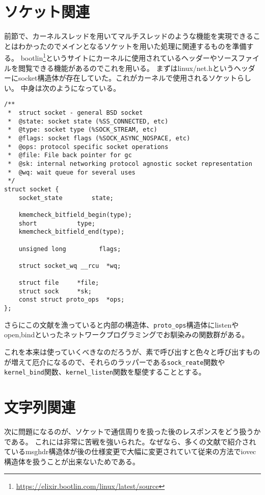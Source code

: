 \section{ソケット関連}

前節で、カーネルスレッドを用いてマルチスレッドのような機能を実現できることはわかったのでメインとなるソケットを用いた処理に関連するものを準備する。
bootlin\footnote{\url{https://elixir.bootlin.com/linux/latest/source}}というサイトにカーネルに使用されているヘッダーやソースファイルを閲覧できる機能があるのでこれを用いる。
まずはlinux/net.hというヘッダーにsocket構造体が存在していた。これがカーネルで使用されるソケットらしい。
中身は次のようになっている。
\begin{verbatim}
/**
 *  struct socket - general BSD socket
 *  @state: socket state (%SS_CONNECTED, etc)
 *  @type: socket type (%SOCK_STREAM, etc)
 *  @flags: socket flags (%SOCK_ASYNC_NOSPACE, etc)
 *  @ops: protocol specific socket operations
 *  @file: File back pointer for gc
 *  @sk: internal networking protocol agnostic socket representation
 *  @wq: wait queue for several uses
 */
struct socket {
    socket_state        state;

    kmemcheck_bitfield_begin(type);
    short           type;
    kmemcheck_bitfield_end(type);

    unsigned long         flags;

    struct socket_wq __rcu  *wq;

    struct file     *file;
    struct sock     *sk;
    const struct proto_ops  *ops;
};
\end{verbatim}

さらにこの文献を漁っていると内部の構造体、\verb|proto_ops|構造体にlistenやopen,bindといったネットワークプログラミングでお馴染みの関数群がある。

これを本来は使っていくべきなのだろうが、素で呼び出すと色々と呼び出すものが増えて厄介になるので、それらのラッパーである\verb|sock_reate|関数や\verb|kernel_bind|関数、\verb|kernel_listen|関数を駆使することとする。

\section{文字列関連}
次に問題になるのが、ソケットで通信周りを扱った後のレスポンスをどう扱うかである。
これには非常に苦戦を強いられた。なぜなら、多くの文献で紹介されているmsghdr構造体が後の仕様変更で大幅に変更されていて従来の方法でiovec構造体を扱うことが出来ないためである。

